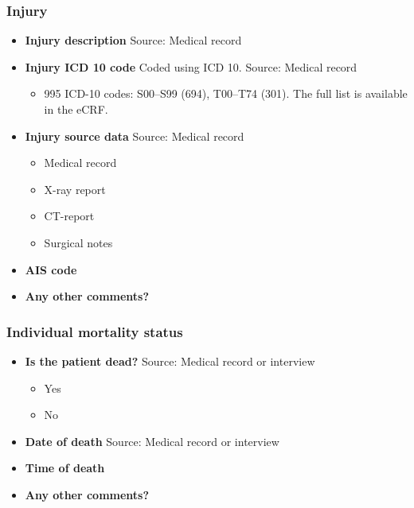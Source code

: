 \documentclass[
]{scrartcl}
\providecommand{\tightlist}{%
  \setlength{\itemsep}{0pt}\setlength{\parskip}{0pt}}\usepackage{longtable,booktabs,array}
\begin{document}
\subsubsection{Injury}\label{injury}

\begin{itemize}
\item
  \textbf{Injury description} Source: Medical record
\item
  \textbf{Injury ICD 10 code} Coded using ICD 10. Source: Medical record

  \begin{itemize}
  \tightlist
  \item
    995 ICD-10 codes: S00--S99 (694), T00--T74 (301). The full list is
    available in the eCRF.
  \end{itemize}
\item
  \textbf{Injury source data} Source: Medical record

  \begin{itemize}
  \tightlist
  \item
    Medical record
  \item
    X-ray report
  \item
    CT-report
  \item
    Surgical notes
  \end{itemize}
\item
  \textbf{AIS code}
\item
  \textbf{Any other comments?}
\end{itemize}

\subsubsection{Individual mortality
status}\label{individual-mortality-status}

\begin{itemize}
\item
  \textbf{Is the patient dead?} Source: Medical record or interview

  \begin{itemize}
  \tightlist
  \item
    Yes
  \item
    No
  \end{itemize}
\item
  \textbf{Date of death} Source: Medical record or interview
\item
  \textbf{Time of death}
\item
  \textbf{Any other comments?}
\end{itemize}
\end{document}
